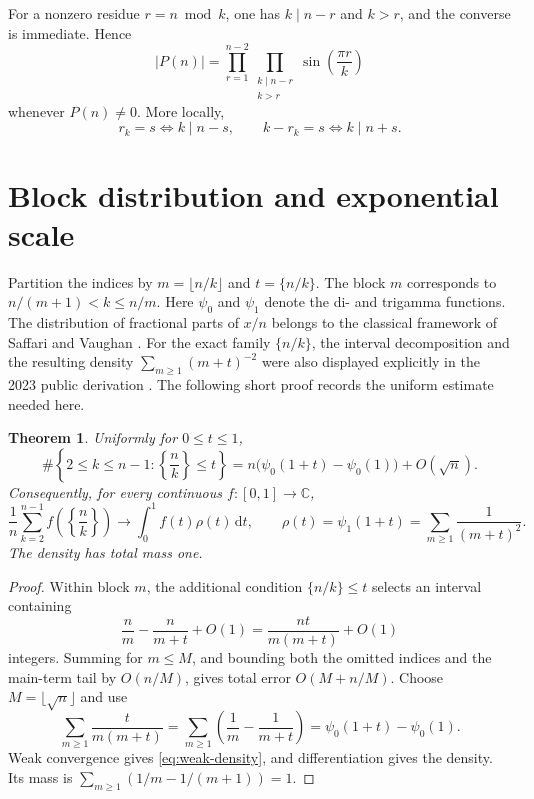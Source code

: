 \documentclass[11pt]{amsart}
\numberwithin{equation}{section}
\newtheorem{theorem}{Theorem}[section]
\theoremstyle{definition}
\theoremstyle{remark}
\newcommand{\C}{\mathbb C}
\newcommand{\dd}{\,\mathrm d}
\begin{document}
For a nonzero residue \(r=n\bmod k\), one has \(k\mid n-r\) and \(k>r\),
and the converse is immediate.  Hence
\begin{equation}\label{eq:divisor-indexed}
 |P(n)|=\prod_{r=1}^{n-2}
 \prod_{\substack{k\mid n-r\\k>r}}
 \sin\!\left(\frac{\pi r}{k}\right)
\end{equation}
whenever \(P(n)\ne0\).  More locally,
\begin{equation}\label{eq:shifted-divisors}
 r_k=s\iff k\mid n-s,
 \qquad k-r_k=s\iff k\mid n+s.
\end{equation}

\section{Block distribution and exponential scale}
\label{sec:block-scale}

Partition the indices by
\(m=\lfloor n/k\rfloor\) and \(t=\{n/k\}\).  The block \(m\)
corresponds to \(n/(m+1)<k\leq n/m\).
Here \(\psi_0\) and \(\psi_1\) denote the di- and trigamma functions.
The distribution of fractional parts of \(x/n\) belongs to the classical
framework of Saffari and Vaughan \cite{SaffariVaughan1977}.  For the exact
family \(\{n/k\}\), the interval decomposition and the resulting density
\(\sum_{m\geq1}(m+t)^{-2}\) were also displayed explicitly in the 2023
public derivation \cite{MikeTeX2023}.  The following short proof records the
uniform estimate needed here.

\begin{theorem}\label{thm:block-count}
Uniformly for \(0\leq t\leq1\),
\begin{equation}\label{eq:block-count}
 \#\left\{2\leq k\leq n-1:\left\{\frac nk\right\}\leq t\right\}
 =n\bigl(\psi_0(1+t)-\psi_0(1)\bigr)+O(\sqrt n).
\end{equation}
Consequently, for every continuous \(f:[0,1]\to\C\),
\begin{equation}\label{eq:weak-density}
 \frac1n\sum_{k=2}^{n-1}f\!\left(\left\{\frac nk\right\}\right)
 \longrightarrow\int_0^1 f(t)\rho(t)\dd t,
 \qquad
 \rho(t)=\psi_1(1+t)=\sum_{m\geq1}\frac1{(m+t)^2}.
\end{equation}
The density has total mass one.
\end{theorem}

\begin{proof}
Within block \(m\), the additional condition \(\{n/k\}\leq t\) selects
an interval containing
\[
 \frac{n}{m}-\frac{n}{m+t}+O(1)
 =\frac{nt}{m(m+t)}+O(1)
\]
integers.  Summing for \(m\leq M\), and bounding both the omitted indices
and the main-term tail by \(O(n/M)\), gives total error
\(O(M+n/M)\).  Choose \(M=\lfloor\sqrt n\rfloor\) and use
\[
 \sum_{m\geq1}\frac{t}{m(m+t)}
 =\sum_{m\geq1}\left(\frac1m-\frac1{m+t}\right)
 =\psi_0(1+t)-\psi_0(1).
\]
Weak convergence gives \eqref{eq:weak-density}, and differentiation gives
the density.  Its mass is
\(\sum_{m\geq1}(1/m-1/(m+1))=1\).
\end{proof}
\end{document}
